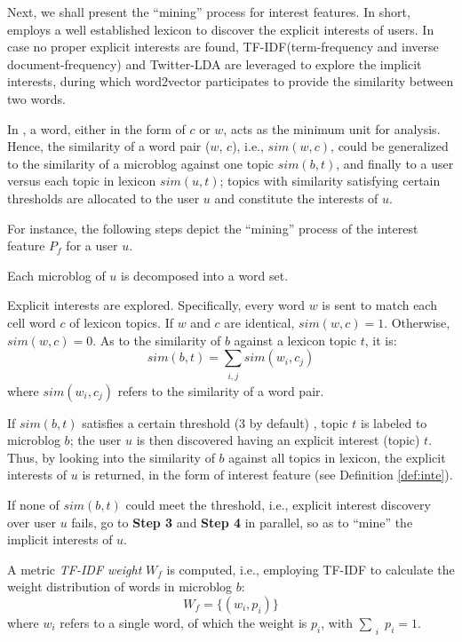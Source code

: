 Next, we shall present the ``mining'' process for interest features.
In short, \sys{} employs a well established lexicon to discover the explicit interests of users.
In case no proper explicit interests are found, TF-IDF(term-frequency and inverse document-frequency) and Twitter-LDA \cite{IEEEexample:zhao2011comparing} are leveraged to explore the implicit interests, during which word2vector participates to provide the similarity between two words.

In \sys{}, a word, either in the form of $c$ or $w$, acts as the minimum unit for analysis.
Hence, the similarity of a word pair ($w$, $c$), i.e., $sim(w, c)$, could be generalized to the similarity of a microblog against one topic $sim(b, t)$, and finally to a user versus each topic in lexicon $sim(u, t)$; topics with similarity satisfying certain thresholds are allocated to the user $u$ and constitute the interests of $u$.

For instance, the following steps depict the ``mining'' process of the interest feature $P_f$ for a user $u$.

 Each microblog of $u$ is decomposed into a word set. %

 Explicit interests are explored. Specifically, every word $w$ is sent to match each cell word $c$ of lexicon topics.
If $w$ and $c$ are identical, $sim(w, c) = 1$.
Otherwise, $sim(w, c) = 0$.
As to the similarity of $b$ against a lexicon topic $t$, it is:
\begin{equation}
\label{eq:bt}
sim(b, t) = \sum_{\substack{i, j}} sim(w_i, c_j)
\end{equation}
where $sim(w_i, c_j)$ refers to the similarity of a word pair.

If $sim(b, t)$ satisfies a certain threshold (3 by default) , topic $t$ is labeled to microblog $b$;
the user $u$ is then discovered having an explicit interest (topic) $t$.
Thus, by looking into the similarity of $b$ against all topics in lexicon, the explicit interests of $u$ is returned, in the form of interest feature (see Definition \ref{def:inte}).

If none of $sim(b, t)$ could meet the threshold, i.e., explicit interest discovery over user $u$ fails, go to \textbf{Step 3} and \textbf{Step 4} in parallel, so as to ``mine'' the implicit interests of $u$.

 A metric \textit{TF-IDF weight} $W_f$ is computed, i.e., employing TF-IDF to calculate the weight distribution of words in microblog $b$:
\begin{equation}
\label{eq:tf}
W_f = \{(w_i, p_i)\}
\end{equation}
where $w_i$ refers to a single word, of which the weight is $p_i$, with $\sum_{\substack{i}} p_i = 1$.

